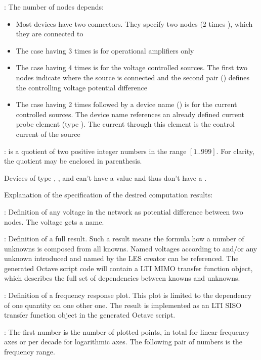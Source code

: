 : The number of nodes depends:
\begin{itemize}
  \item Most devices have two connectors. They specify two nodes (2 times
    ), which they are connected to
  \item The case having 3 times  is for operational
    amplifiers only
  \item The case having 4 times  is for the voltage
    controlled sources. The first two nodes indicate where the source is
    connected and the second pair () defines the
    controlling voltage potential difference
  \item The case having 2 times  followed by a device name
    () is for the current controlled sources. The device
    name references an already defined current probe element (type
    ). The current through this element is the control current of
    the source
\end{itemize}

:  is a quotient of two positive
integer numbers in the range $[1..999]$. For clarity, the quotient may be
enclosed in parenthesis.

Devices of type , ,  and  can't have a
value and thus don't have a .


Explanation of the specification of the desired computation results:

: Definition of any voltage in the network as potential
difference between two nodes. The voltage gets a name.

: Definition of a full result. Such a result means the
formula how a number of unknowns is composed from all knowns. Named
voltages according to  and/or any unknown introduced
and named by the LES creator can be referenced. The generated Octave
script code will contain a LTI MIMO transfer function object, which
describes the full set of dependencies between knowns and unknowns.

: Definition of a frequency response plot. This plot
is limited to the dependency of one quantity on one other one. The result
is implemented as an LTI SISO transfer function object in the generated
Octave script.

: The first number is the number of plotted points, in
total for linear frequency axes or per decade for logarithmic axes. The
following pair of numbers is the frequency range.


